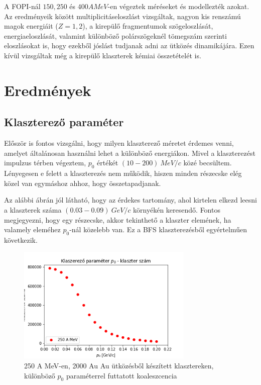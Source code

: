 \documentclass[a4paper,12pt]{article}
\begin{document}
\vspace{5mm}

\par A FOPI-nál $150, 250$ és $400 A MeV$-en végeztek méréseket és modellezték azokat. Az eredményeik között multiplicitáseloszlást vizsgáltak, nagyon kis renszámú magok energiáit ($ Z = 1,2$), a kirepülő fragmentumok szögeloszlását, energiaeloszlását, valamint különböző polárszögeknél tömegszám szerinti eloszlásokat is, hogy ezekből jóslást tudjanak adni az ütközés dinamikájára. Ezen kívül vizsgáltak még a kirepülő klaszterek kémiai összetételét is. 

\section{ Eredmények}

\subsection{Klaszterező paraméter}

\par Először is fontos vizsgálni, hogy milyen klaszterező méretet érdemes venni, amelyet általánosan használni lehet a különböző energiákon. Mivel a klaszterezést impulzus térben végeztem, $p_{0}$ értékét $(10 - 200) ~MeV/c$ közé becsültem. Lényegesen e felett a klaszterezés nem működik, hiszen minden részecske elég közel van egymáshoz ahhoz, hogy összetapadjanak. 

\vspace{5mm}

\par Az alábbi ábrán jól látható, hogy az érdekes tartomány, ahol kirtelen elkezd leesni a klaszterek száma $(0.03 - 0.09) ~GeV/c$ környékén keresendő. Fontos megjegyezni, hogy egy részecske, akkor tekinthető a klaszter elemének, ha valamely eleméhez $p_{0}$-nál közelebb van. Ez a BFS klaszterezésből egyértelműen következik. 

\vspace{5mm}

\begin{figure}[!htb]
\centering
\includegraphics[width=0.75\textwidth]{./klaszterszamparameter.png}
\caption{250 A MeV-en, 2000 Au Au ütközésből készített klasztereken, különböző $p_{0}$ paraméterrel futtatott koaleszcencia}
\end{figure}
\end{document}
